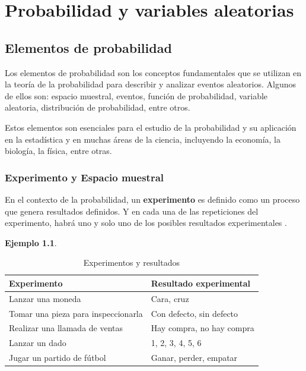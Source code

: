\documentclass[
  11pt,
]{book}
\theoremstyle{definition}
\theoremstyle{definition}
\newtheorem{example}{Ejemplo}[chapter]
\theoremstyle{definition}
\theoremstyle{definition}
\theoremstyle{remark}
\begin{document}
\chapter{Probabilidad y variables aleatorias}\label{probabilidad-y-variables-aleatorias}

\section{Elementos de probabilidad}\label{elementos-de-probabilidad}

Los elementos de probabilidad son los conceptos fundamentales que se utilizan en la teoría de la probabilidad para describir y analizar eventos aleatorios. Algunos de ellos son: espacio muestral, eventos, función de probabilidad, variable aleatoria, distribución de probabilidad, entre otros.

Estos elementos son esenciales para el estudio de la probabilidad y su aplicación en la estadística y en muchas áreas de la ciencia, incluyendo la economía, la biología, la física, entre otras.

\subsection{Experimento y Espacio muestral}\label{experimento-y-espacio-muestral}

En el contexto de la probabilidad, un \textbf{experimento} es definido como un proceso que genera resultados definidos. Y en cada una de las repeticiones del experimento, habrá uno y solo uno de los posibles resultados experimentales \citep[página 143]{anderson}.

\begin{example}
\leavevmode

\begin{table}[H]
\centering
\caption{\label{tab:experimentos}Experimentos y resultados}
\centering
\begin{tabular}[t]{ll}
\toprule
Experimento & Resultado experimental\\
\midrule
Lanzar una moneda & Cara, cruz\\
Tomar una pieza para inspeccionarla & Con defecto, sin defecto\\
Realizar una llamada de ventas & Hay compra, no hay compra\\
Lanzar un dado & 1, 2, 3, 4, 5, 6\\
Jugar un partido de fútbol & Ganar, perder, empatar\\
\bottomrule
\end{tabular}
\end{table}

\end{example}
\end{document}
